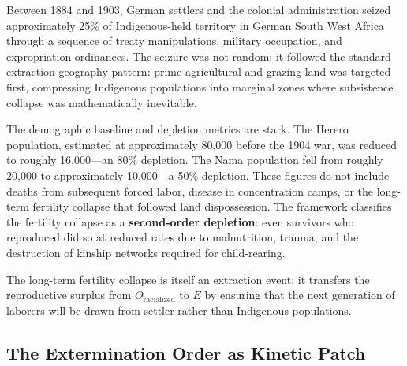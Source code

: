 Between 1884 and 1903, German settlers and the colonial administration seized approximately 25\% of Indigenous-held territory in German South West Africa through a sequence of treaty manipulations, military occupation, and expropriation ordinances. The seizure was not random; it followed the standard extraction-geography pattern: prime agricultural and grazing land was targeted first, compressing Indigenous populations into marginal zones where subsistence collapse was mathematically inevitable.

The demographic baseline and depletion metrics are stark. The Herero population, estimated at approximately 80,000 before the 1904 war, was reduced to roughly 16,000---an 80\% depletion. The Nama population fell from roughly 20,000 to approximately 10,000---a 50\% depletion. These figures do not include deaths from subsequent forced labor, disease in concentration camps, or the long-term fertility collapse that followed land dispossession. The framework classifies the fertility collapse as a \textbf{second-order depletion}: even survivors who reproduced did so at reduced rates due to malnutrition, trauma, and the destruction of kinship networks required for child-rearing.

The long-term fertility collapse is itself an extraction event: it transfers the reproductive surplus from $O_{\text{racialized}}$ to $E$ by ensuring that the next generation of laborers will be drawn from settler rather than Indigenous populations.

\subsection{The Extermination Order as Kinetic Patch}


